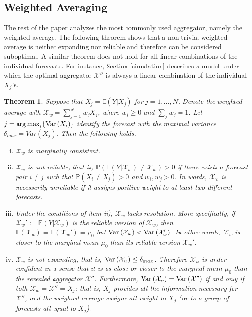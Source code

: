 \documentclass[11pt]{article}
\renewcommand{\P}{\mathbb{P}}
\newcommand{\E}{\mathbb{E}}
\newtheorem{theorem}{Theorem}[section]
\DeclareMathOperator*{\argmax}{arg\,max}
\theoremstyle{definition}
\theoremstyle{definition}
\def\P{{\mathbb P}}
\def\E{{\mathbb E}}
\def\Var{{\rm Var}\,}
\begin{document}
\subsection{Weighted Averaging} \label{contraction}

The rest of the paper analyzes the most commonly used aggregator, namely the weighted average. The following theorem shows that a non-trivial weighted average is neither expanding nor reliable and therefore can be considered suboptimal. A similar theorem does not hold for all linear combinations of the individual forecasts. For instance, Section \ref{simulation} describes a model under which the optimal aggregator $\mathcal{X}''$ is always a linear combination of the individual $X_j$'s.




\begin{theorem}\label{contraction}
Suppose that $X_j = \E(Y | X_j)$ for $j = 1, \dots, N$. Denote the weighted average with $\mathcal{X}_w = \sum_{j=1}^N w_jX_j$, where  $w_j \geq 0$ and $\sum_j w_j = 1$.  Let $j = \argmax_i \{ \Var(X_i)  \}$ identify the forecast with the maximal variance $\delta_{max} = Var(X_j)$. Then the following holds.
\begin{enumerate}[i)]
\item  $\mathcal{X}_w$ is marginally consistent.
\item $\mathcal{X}_w$ is not reliable, that is, $\P\left(\E(Y | \mathcal{X}_w) \neq \mathcal{X}_w\right) > 0$ if there exists a forecast pair $i \neq j$ such that $\P(X_i \neq X_j) > 0$ and $w_i, w_j > 0$. In words, $\mathcal{X}_w$ is necessarily unreliable if it assigns positive weight to at least two different forecasts. 
 
 \item Under the conditions of item ii), $\mathcal{X}_w$ lacks resolution. More specifically, if $\mathcal{X}_w' :=  \E(Y| \mathcal{X}_w)$ is the reliable version of $\mathcal{X}_w$, then $\E(\mathcal{X}_w) = \E(\mathcal{X}_w') = \mu_0$ but $\Var(\mathcal{X}_w) < \Var(\mathcal{X}_w')$. In other words, $\mathcal{X}_w$ is closer to the marginal mean $\mu_0$ than its reliable version $\mathcal{X}_w'$. \label{underconfA}
 
\item $\mathcal{X}_w$ is not expanding, that is, $\Var(\mathcal{X}_w) \leq \delta_{max}$. Therefore $\mathcal{X}_w$ is under-confident in a sense that it is as close or closer to the marginal mean $\mu_0$ than the revealed aggregator $\mathcal{X}''$.  Furthermore, $\Var(\mathcal{X}_w) = \Var(\mathcal{X}'')$ if and only if both $\mathcal{X}_w = \mathcal{X}'' = X_j$; that is,  $X_j$ provides all the information necessary for $\mathcal{X}''$, and the weighted average assigns all weight to $X_j$ (or to a group of forecasts all equal to $X_j$). \label{underconfB}
\end{enumerate}
\end{theorem}
\end{document}
